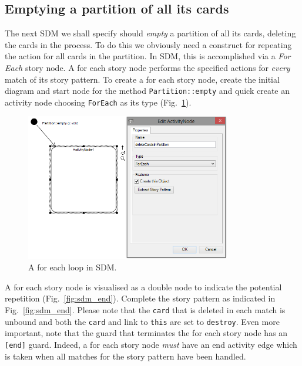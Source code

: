 \subsection{Emptying a partition of all its cards}
\label{sec:empty}

The next SDM we shall specify should \emph{empty} a partition of all its cards,
deleting the cards in the process.  To do this we obviously need a construct for
repeating the action for all cards in the partition.  In SDM, this is
accomplished via a \emph{For Each} story node.  A for each story node performs
the specified actions for \emph{every} match of its story pattern.  To create a
for each story node, create the initial diagram and start node for the method
\texttt{Partition::empty} and quick create an activity node choosing
\texttt{ForEach} as its type (Fig.~\ref{fig:sdm_foreach}).

\begin{figure}[htbp]
\begin{center}
  \includegraphics[width=0.8\textwidth]{pics/sdmBilder/empty/sdm42RAW}
  \caption{A for each loop in SDM.}  
  \label{fig:sdm_foreach}
\end{center}
\end{figure}

A for each story node is visualised as a double node to indicate the
potential repetition (Fig.~\ref{fig:sdm_end}). Complete the story pattern as
indicated in Fig.~\ref{fig:sdm_end}.  Please note that the \texttt{card} that is
deleted in each match is unbound and both the \texttt{card} and link to
\texttt{this} are set to \texttt{destroy}.  Even more important, note that the
guard that terminates the for each story node has an \texttt{[end]} guard. 
Indeed, a for each story node \emph{must} have an end activity edge which is
taken when all matches for the story pattern have been handled.

